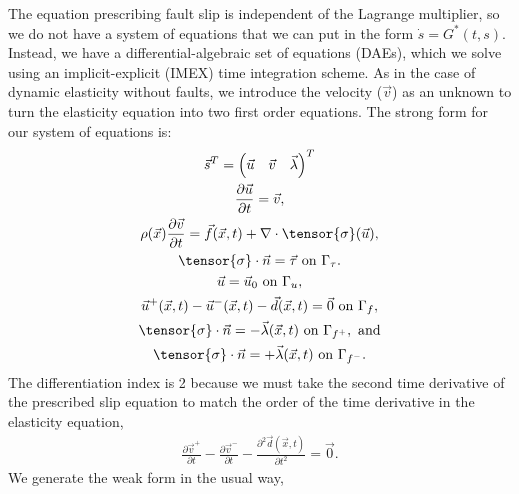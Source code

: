 The equation prescribing fault slip is independent of the Lagrange
multiplier, so we do not have a system of equations that we can put in
the form $\dot{s} = G^*(t,s)$. Instead, we have a
differential-algebraic set of equations (DAEs), which we solve using
an implicit-explicit (IMEX) time integration scheme. As in the case of
dynamic elasticity without faults, we introduce the velocity
($\vec{v}$) as an unknown to turn the elasticity equation into two
first order equations. The strong form for our system of equations is:
\begin{gather}
  \vec{s}^T = \left( \vec{u} \quad \vec{v} \quad \vec{\lambda} \right)^T \\
  \frac{\partial \vec{u}}{\partial t} = \vec{v}, \\
  \rho(\vec{x}) \frac{\partial \vec{v}}{\partial t} =
  \vec{f}(\vec{x},t) + \nabla \cdot \tensor{\sigma}(\vec{u}), \\
  \tensor{\sigma} \cdot \vec{n} = \vec{\tau} \text{ on } \Gamma_\tau. \\
  \vec{u} = \vec{u}_0 \text{ on } \Gamma_u, \\
  \vec{u}^+(\vec{x},t) - \vec{u}^-(\vec{x},t) - \vec{d}(\vec{x},t) = \vec{0} \text{ on }\Gamma_f,  \\
  \tensor{\sigma} \cdot \vec{n} = -\vec{\lambda}(\vec{x},t) \text{ on }\Gamma_{f^+}, \text{ and}\\
  \tensor{\sigma} \cdot \vec{n} = +\vec{\lambda}(\vec{x},t) \text{ on }\Gamma_{f^-}.
\end{gather}
The differentiation index is 2 because we must take the second time
derivative of the prescribed slip equation to match the order of the
time derivative in the elasticity equation,
\begin{gather}
  \frac{\partial \vec{v}^+}{\partial t} - \frac{\partial \vec{v}^-}{\partial t} -
  \frac{\partial^2 \vec{d}(\vec{x},t)}{\partial t^2} = \vec{0}.
\end{gather}
We generate the weak form in the usual way,
